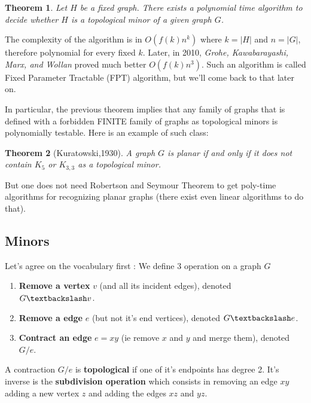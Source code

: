 \documentclass[12pt,a4paper]{article}
\newtheorem{theorem}{Theorem}
\begin{document}
\begin{theorem}
  Let $H$ be a fixed graph.  There exists a polynomial time algorithm to decide
  whether $H$ is a topological minor of a given graph $G$.
\end{theorem}

The complexity of the algorithm is in $O(f(k)n^k)$ where $k=|H|$ and $n=|G|$,
therefore polynomial for every fixed $k$. Later, in 2010, \textit{Grohe,
  Kawabarayashi, Marx, and Wollan} proved much better $O(f(k)n^3)$.  Such an
algorithm is called Fixed Parameter Tractable (FPT) algorithm, but we'll come
back to that later on.

In particular, the previous theorem implies that any family of graphs that is
defined with a forbidden FINITE family of graphs as topological minors is
polynomially testable.  Here is an example of such class:

\begin{theorem}[Kuratowski,1930]
  A graph $G$ is planar if and only if it does not contain $K_5$ or $K_{3,3}$ as
  a topological minor.
\end{theorem}

But one does not need Robertson and Seymour Theorem to get poly-time algorithms
for recognizing planar graphs (there exist even linear algorithms to do that).

\subsection{Minors}

Let's agree on the vocabulary first : We define 3 operation on a graph $G$
\begin{enumerate}

\item \textbf{Remove a vertex} $v$ (and all its incident edges), denoted $G \textbackslash v$.
\item \textbf{Remove a edge} $e$ (but not it's end vertices), denoted $G \textbackslash e$.
\item \textbf{Contract an edge} $e=xy$ (ie remove $x$ and $y$ and merge them), denoted $G/e$. 
\end{enumerate}
A contraction $G/e$ is \textbf{topological} if one of it's endpoints has degree 2. It's inverse is the \textbf{subdivision operation} which consists in removing an edge $xy$ adding a new vertex $z$ and adding the edges $xz$ and $yz$.
\end{document}
